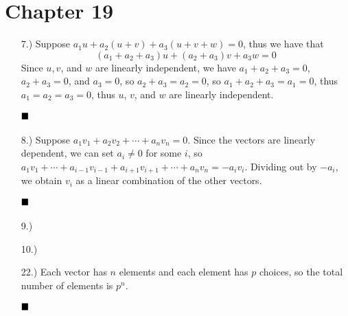 \documentclass[11pt]{article}
\newcommand{\done}{
    \ensuremath{\strut\hfill\blacksquare}
}
\begin{document}

\pagestyle{fancy}
\fancyhead{}

\normalsize

\section*{Chapter 19}

\begin{itemize}
    \item [7.)] Suppose $a_1u+a_2(u+v)+a_3(u+v+w)=0$, thus we have that
    \[(a_1+a_2+a_3)u+(a_2+a_3)v+a_3w=0\]
    Since $u,v$, and $w$ are linearly independent, we have $a_1+a_2+a_3=0$,
    $a_2+a_3=0$, and $a_3=0$, so $a_2+a_3=a_2=0$, so $a_1+a_2+a_3=a_1=0$, thus
    $a_1=a_2=a_3=0$, thus $u$, $v$, and $w$ are linearly independent.
    \done

    \item [8.)] Suppose $a_1v_1+a_2v_2+\cdots+a_nv_n=0$. Since the vectors are
    linearly dependent, we can set $a_i\ne0$ for some $i$, so
    $a_1v_1+\cdots+a_{i-1}v_{i-1}+a_{i+1}v_{i+1}+\cdots+a_nv_n=-a_iv_i$.
    Dividing out by $-a_i$, we obtain $v_i$ as a linear combination of the
    other vectors. 
    \done

    \item [9.)] 

    \item [10.)] 

    \item [22.)] Each vector has $n$ elements and each element has $p$ choices,
    so the total number of elements is $p^n$.
    \done
\end{itemize}
\end{document}
